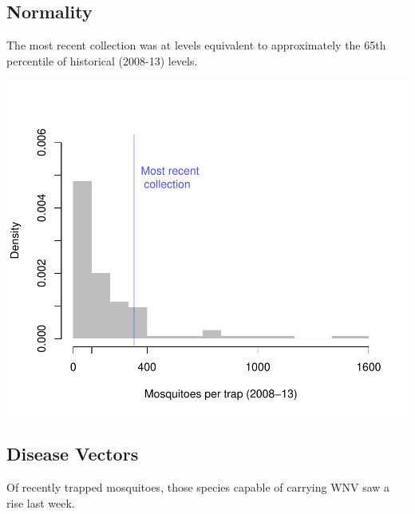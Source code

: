\documentclass{article}
\begin{document}
\begin{multicols}{2} 


\vfill
\columnbreak
\subsection*{Normality}
The most recent collection was at levels equivalent to approximately the 65th percentile of historical (2008-13) levels.

\includegraphics{mosquitoReport-004}

\vfill
\columnbreak



\subsection*{Disease Vectors}

Of recently trapped mosquitoes, those species capable of carrying WNV saw a rise last week.


\end{multicols}
\end{document}
